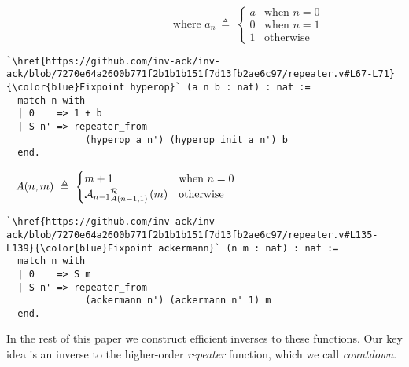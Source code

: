 \begin{equation*}
\hspace{8em}\text{where  } a_n ~ \triangleq ~ \begin{cases}
a & \text{when } n = 0 \\
0 & \text{when } n = 1 \\
1 & \text{otherwise}
\end{cases}
\end{equation*}
\begin{lstlisting} 
`\href{https://github.com/inv-ack/inv-ack/blob/7270e64a2600b771f2b1b1b151f7d13fb2ae6c97/repeater.v#L67-L71}{\color{blue}Fixpoint hyperop}` (a n b : nat) : nat :=
  match n with
  | 0    => 1 + b
  | S n' => repeater_from
              (hyperop a n') (hyperop_init a n') b
  end.
\end{lstlisting}

\begin{equation*}
A(n,m) ~ \triangleq ~ \begin{cases}
m + 1 & \text{when } n = 0 \\
\rf{\mathcal{A}_{n-1}}{A(n-1,1)\ }(m) & \text{otherwise}
\end{cases} \qquad \qquad \qquad \qquad \qquad \qquad \qquad ~ 
\end{equation*}
\begin{lstlisting}
`\href{https://github.com/inv-ack/inv-ack/blob/7270e64a2600b771f2b1b1b151f7d13fb2ae6c97/repeater.v#L135-L139}{\color{blue}Fixpoint ackermann}` (n m : nat) : nat :=
  match n with
  | 0    => S m
  | S n' => repeater_from
              (ackermann n') (ackermann n' 1) m
  end.
\end{lstlisting}
In the rest of this paper we construct efficient inverses to these
functions.  Our key idea is an inverse to the higher-order \emph{repeater} function, which we call \emph{countdown}.

